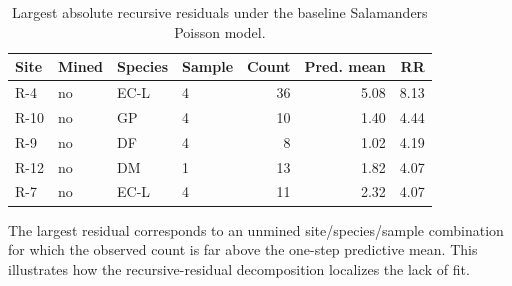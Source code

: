 \begin{table}[H]
\centering
\small
\caption{Largest absolute recursive residuals under the baseline Salamanders Poisson model.}
\label{tab:empirical-salamanders-extreme-residuals}
\begin{tabular}{llllrrr}
\toprule
Site & Mined & Species & Sample & Count & Pred. mean & RR \\
\midrule
R-4 & no & EC-L & 4 & 36 & 5.08 & 8.13 \\
R-10 & no & GP & 4 & 10 & 1.40 & 4.44 \\
R-9 & no & DF & 4 & 8 & 1.02 & 4.19 \\
R-12 & no & DM & 1 & 13 & 1.82 & 4.07 \\
R-7 & no & EC-L & 4 & 11 & 2.32 & 4.07 \\
\bottomrule
\end{tabular}
\par\vspace{0.5ex}\footnotesize{The largest residual corresponds to an unmined site/species/sample combination for which the observed count is far above the one-step predictive mean. This illustrates how the recursive-residual decomposition localizes the lack of fit.}
\end{table}
